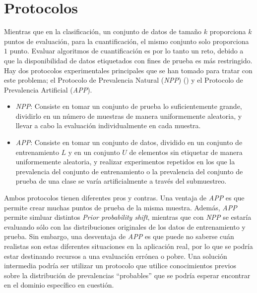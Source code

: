 \section{Protocolos}

Mientras que en la clasificación, un conjunto de datos de tamaño $k$ proporciona
$k$ puntos de evaluación, para la cuantificación, el mismo conjunto solo
proporciona $1$ punto. Evaluar algoritmos de cuantificación es por lo tanto un
reto, debido a que la disponibilidad de datos etiquetados con fines de prueba es
más restringido. Hay dos protocolos experimentales principales que se han tomado
para tratar con este problema; el Protocolo de Prevalencia Natural ({\it NPP\/})
() y el Protocolo de Prevalencia Artificial ({\it APP\/}).

\begin{itemize}
    \item {\it NPP\/}: Consiste en tomar un conjunto de prueba lo
    suficientemente grande, dividirlo en un número de muestras de manera
    uniformemente aleatoria, y llevar a cabo la evaluación individualmente en
    cada muestra.
    \item {\it APP\/}: Consiste en tomar un conjunto de datos, dividido en un
    conjunto de entrenamiento $L$ y en un conjunto $U$ de elementos sin
    etiquetar de manera uniformemente aleatoria, y realizar experimentos
    repetidos en los que la prevalencia del conjunto de entrenamiento o la
    prevalencia del conjunto de prueba de una clase se varía artificialmente a
    través del submuestreo.
\end{itemize}

Ambos protocolos tienen diferentes pros y contras. Una ventaja de {\it APP\/} es
que permite crear muchas puntos de prueba de la misma muestra. Además, {\it
APP\/} permite simluar distintos {\it Prior probability shift}, mientras que con
{\it NPP\/} se estaría evaluando sólo con las distribuciones originales de los
datos de entrenamiento y prueba. Sin embargo, una desventaja de {\it APP\/} es
que puede no saberse cuán realistas son estas diferentes situaciones en la
aplicación real, por lo que se podría estar destinando recursos a una evaluación
errónea o pobre. Una solución intermedia podría ser utilizar un protocolo que
utilice conocimientos previos sobre la distribución de prevalencias “probables”
que se podría esperar encontrar en el dominio específico en cuestión.
